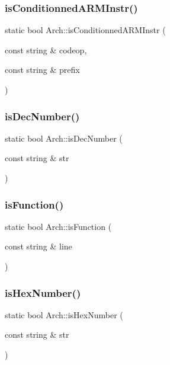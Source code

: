 \subsubsection{\texorpdfstring{is\+Conditionned\+A\+R\+M\+Instr()}{isConditionnedARMInstr()}}
{\footnotesize\ttfamily static bool Arch\+::is\+Conditionned\+A\+R\+M\+Instr (\begin{DoxyParamCaption}\item[{const string \&}]{codeop,  }\item[{const string \&}]{prefix }\end{DoxyParamCaption})\hspace{0.3cm}{\ttfamily [static]}}

\mbox{\label{classArch_ab872a6e1e060fce6dbd631ade563a482}} 
\subsubsection{\texorpdfstring{is\+Dec\+Number()}{isDecNumber()}}
{\footnotesize\ttfamily static bool Arch\+::is\+Dec\+Number (\begin{DoxyParamCaption}\item[{const string \&}]{str }\end{DoxyParamCaption})\hspace{0.3cm}{\ttfamily [static]}}

\mbox{\label{classArch_a7c6ebd1702f075660199527678bd8612}} 
\subsubsection{\texorpdfstring{is\+Function()}{isFunction()}}
{\footnotesize\ttfamily static bool Arch\+::is\+Function (\begin{DoxyParamCaption}\item[{const string \&}]{line }\end{DoxyParamCaption})\hspace{0.3cm}{\ttfamily [static]}}

\mbox{\label{classArch_a98b7249989defd4bdc9cd672592a0262}} 
\subsubsection{\texorpdfstring{is\+Hex\+Number()}{isHexNumber()}}
{\footnotesize\ttfamily static bool Arch\+::is\+Hex\+Number (\begin{DoxyParamCaption}\item[{const string \&}]{str }\end{DoxyParamCaption})\hspace{0.3cm}{\ttfamily [static]}}

